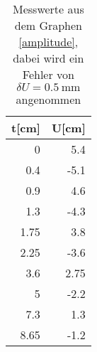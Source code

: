 \begin{table}
\begin{center}
\begin{tabular}{r|r}
t[cm] & U[cm] \\
\hline
0 & 5.4 \\
0.4 & -5.1 \\
0.9 & 4.6 \\
1.3 & -4.3 \\
1.75 & 3.8 \\
2.25 & -3.6 \\
3.6 & 2.75 \\
5 & -2.2 \\
7.3 & 1.3 \\
8.65 & -1.2\\
\end{tabular}
\caption[Messwerte zu a]{Messwerte aus dem Graphen \eqref{amplitude}, dabei wird ein Fehler von $\delta U = \SI{0.5}{\milli \meter}$ angenommen}
\label{werte_a}
\end{center}
\end{table}
